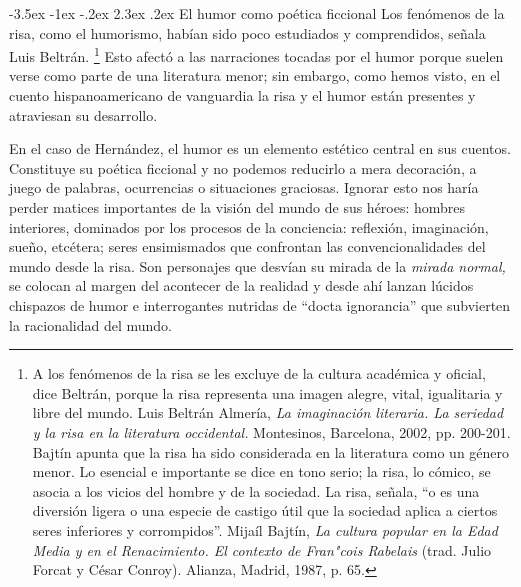\documentclass[14pt,twoside,final]{extbook} %
\makeatletter
\let\oldfootnote\footnote
\renewcommand\footnote[1]{%
\oldfootnote{\hspace{1mm}#1}}
\renewcommand\section{\@startsection {section}{1}{\z@}%
                                     {-3.5ex \@plus -1ex \@minus -.2ex}%
                                     {2.3ex \@plus .2ex}%
                                     {\normalfont\large\bfseries\sc}}
\makeatother
\begin{document}
\section{El humor como poética ficcional}\label{sec:el-humor-como-poetica-ficcional}
Los fenómenos de la risa, como el humorismo, habían sido poco estudiados y comprendidos, señala Luis Beltrán.\footnote{A los fenómenos de la risa se les excluye de la cultura académica y oficial, dice Beltrán, porque la risa representa una imagen alegre, vital, igualitaria y libre del mundo. Luis Beltrán Almería, \emph{La imaginación literaria. La seriedad y la risa en la literatura occidental.} Montesinos, Barcelona, 2002, pp. 200-201. Bajtín apunta que la risa ha sido considerada en la literatura como un género menor. Lo esencial e importante se dice en tono serio; la risa, lo cómico, se asocia a los vicios del hombre y de la sociedad. La risa, señala, ``o es una diversión ligera o una especie de castigo útil que la sociedad aplica a ciertos seres inferiores y corrompidos''.  Mijaíl Bajtín, \emph{La cultura popular en la Edad Media y en el Renacimiento. El contexto de Fran"cois Rabelais} (trad. Julio Forcat y César Conroy). Alianza, Madrid, 1987, p. 65.} Esto afectó a las narraciones tocadas por el humor porque suelen verse como parte de una literatura menor; sin embargo, como hemos visto, en el cuento hispanoamericano de vanguardia la risa y el humor están presentes y atraviesan su desarrollo.

En el caso de Hernández, el humor es un elemento estético central en sus cuentos. Constituye su poética ficcional y no podemos reducirlo a mera decoración, a juego de palabras, ocurrencias o situaciones graciosas. Ignorar esto nos haría perder matices importantes de la visión del mundo de sus héroes: hombres interiores, dominados por los procesos de la conciencia: reflexión, imaginación, sueño, etcétera; seres ensimismados que confrontan las convencionalidades del mundo desde la risa. Son personajes que desvían su mirada de la \emph{mirada normal,} se colocan al margen del acontecer de la realidad y desde ahí lanzan lúcidos chispazos de humor e interrogantes nutridas de ``docta ignorancia'' que subvierten la racionalidad del mundo.
\end{document}
